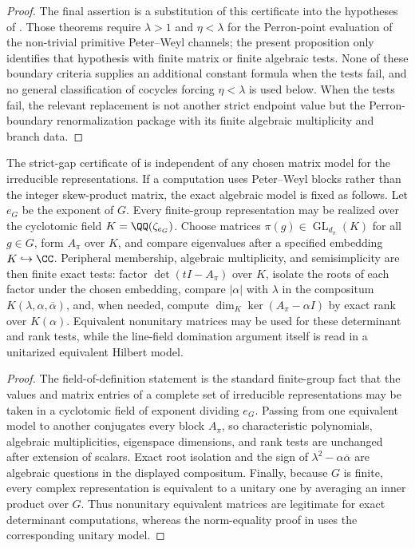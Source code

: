 \begin{proof}
  The final assertion is a substitution of this certificate into the
  hypotheses of
  . Those
  theorems require \(\lambda>1\) and \(\eta<\lambda\) for the Perron-point
  evaluation of the non-trivial primitive Peter--Weyl channels; the present
  proposition only identifies that hypothesis with finite matrix or
  finite algebraic tests.  None of these boundary criteria supplies an
  additional constant formula when the tests fail, and no general
  classification of cocycles forcing \(\eta<\lambda\) is used below.  When
  the tests fail, the relevant replacement is not another strict endpoint
  value but the Perron-boundary renormalization package with its finite
  algebraic multiplicity and branch data.
\end{proof}

\begin{lemma}
  \label{lem:eta-gap-exact-block-models}
  The strict-gap certificate of
   is independent of any chosen
  matrix model for the irreducible representations.  If a computation uses
  Peter--Weyl blocks rather than the integer skew-product matrix, the exact
  algebraic model is fixed as follows.  Let \(e_G\) be the exponent of \(G\).
  Every finite-group representation may be realized over the cyclotomic field
  \(K=\QQ(\zeta_{e_G})\).  Choose matrices
  \(\pi(g)\in\operatorname{GL}_{d_\pi}(K)\) for all \(g\in G\), form
  \(A_\pi\) over \(K\), and compare eigenvalues after a specified embedding
  \(K\hookrightarrow\CC\).  Peripheral membership, algebraic multiplicity,
  and semisimplicity are then finite exact tests:
  factor \(\det(tI-A_\pi)\) over \(K\), isolate the roots of each factor under
  the chosen embedding, compare \(|\alpha|\) with \(\lambda\) in the compositum
  \(K(\lambda,\alpha,\overline\alpha)\), and, when needed, compute
  \(\dim_K\ker(A_\pi-\alpha I)\) by exact rank over \(K(\alpha)\).  Equivalent
  nonunitary matrices may be used for these determinant and rank tests, while
  the line-field domination argument itself is read in a unitarized equivalent
  Hilbert model.
\end{lemma}

\begin{proof}
  The field-of-definition statement is the standard finite-group fact that
  the values and matrix entries of a complete set of irreducible
  representations may be taken in a cyclotomic field of exponent dividing
  \(e_G\).  Passing from one equivalent model to another conjugates every
  block \(A_\pi\), so characteristic polynomials, algebraic multiplicities,
  eigenspace dimensions, and rank tests are unchanged after extension of
  scalars.  Exact root isolation and the sign of
  \(\lambda^2-\alpha\overline\alpha\) are algebraic questions in the displayed
  compositum.  Finally, because \(G\) is finite, every complex representation
  is equivalent to a unitary one by averaging an inner product over \(G\).
  Thus nonunitary equivalent matrices are legitimate for exact determinant
  computations, whereas the norm-equality proof in
   uses the corresponding unitary model.
\end{proof}

